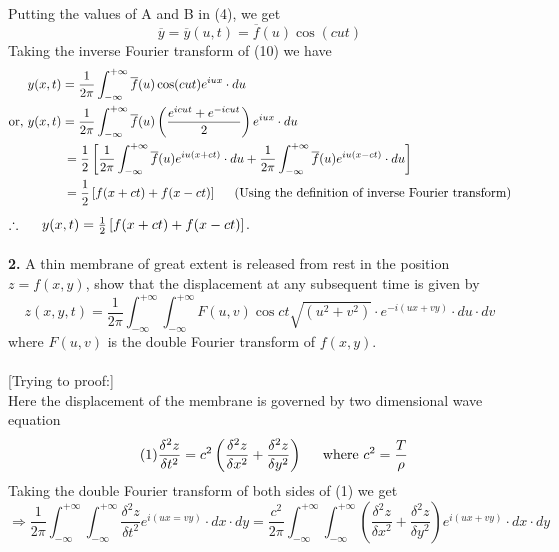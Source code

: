 \documentclass[11pt]{article}
\begin{document}
Putting the values of A and B in (4), we get
\begin{equation}
\overline{y}=\overline{y}(u,t)=\overline{f}(u)\cos (cut)
\end{equation}
Taking the inverse Fourier transform of (10) we have
\begin{align*}
&y(x,t)=\frac{1}{2\pi}\int_{-\infty}^{+\infty}\overline{f}(u)\cos (cut)e^{iux}\cdot du \\
\textrm{or, }&y(x,t)=\frac{1}{2\pi}\int_{-\infty}^{+\infty}\overline{f}(u)\left(\frac{e^{icut}+e^{-icut}}{2}\right) e^{iux}\cdot du \\
&\hspace{1cm}=\frac{1}{2}\left[\frac{1}{2\pi}\int_{-\infty}^{+\infty}\overline{f}(u)e^{iu(x+ct)}\cdot du + \frac{1}{2\pi}\int_{-\infty}^{+\infty}\overline{f}(u)e^{iu(x-ct)}\cdot du\right] \\
&\hspace{1cm}=\frac{1}{2}\left[f(x+ct)+f(x-ct)\right]\hspace{0.5cm} \textrm{(Using the definition of inverse Fourier transform)}
\end{align*}
$\therefore\hspace{0.5cm}y(x,t)=\frac{1}{2}\left[f(x+ct)+f(x-ct)\right]$.
\\
\\
\textbf{2.} A thin membrane of great extent is released from rest in the position $z=f(x,y)$, show that the displacement at any subsequent time is given by
$$z(x,y,t)=\frac{1}{2\pi}\int_{-\infty}^{+\infty}\int_{-\infty}^{+\infty}F(u,v)\cos ct\sqrt{(u^2+v^2)}\cdot e^{-i(ux+vy)}\cdot du\cdot dv$$
where $F(u,v)$ is the double Fourier transform of $f(x,y)$.
\\\\
\hspace{0cm}
[Trying to proof:] \\
Here the displacement of the membrane is governed by two dimensional wave equation
\begin{equation} \tag{1}
\frac{\delta^2z}{\delta t^2}=c^2\left(\frac{\delta^2z}{\delta x^2}+\frac{\delta^2z}{\delta y^2}\right) \hspace{0.5cm}\textrm{where }c^2=\frac{T}{\rho}
\end{equation}
Taking the double Fourier transform of both sides of (1) we get
\begin{displaymath}
\Rightarrow\frac{1}{2\pi}\int_{-\infty}^{+\infty}\int_{-\infty}^{+\infty}\frac{\delta^2z}{\delta t^2}e^{i(ux=vy)}\cdot dx\cdot dy = \frac{c^2}{2\pi}\int_{-\infty}^{+\infty}\int_{-\infty}^{+\infty}\left(\frac{\delta^2z}{\delta x^2}+\frac{\delta^2z}{\delta y^2}\right)e^{i(ux+vy)}\cdot dx\cdot dy 
\end{displaymath}
\end{document}
